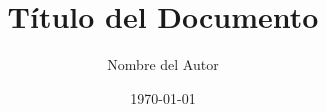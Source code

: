 \usepackage{graphicx}
\usepackage{fancyhdr}
\usepackage{titling}
\usepackage[left=2.54cm,right=2.54cm,top=2.54cm,bottom=2.54cm]{geometry}

\posttitle{\end{center}}

\pagestyle{fancy}
\fancyhf{}
\renewcommand{\headrulewidth}{0pt} %



\title{Título del Documento}
\author{Nombre del Autor}
\date{\today}
\maketitle


